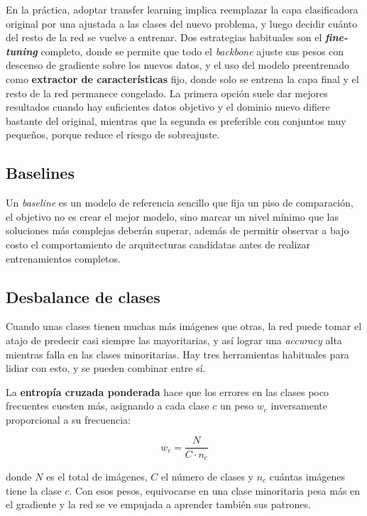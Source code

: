 \documentclass[12pt,letterpaper]{article}
\begin{document}
En la pr\'actica, adoptar transfer learning implica reemplazar la capa clasificadora original por una ajustada a las clases del nuevo problema, y luego decidir cu\'anto del resto de la red se vuelve a entrenar. Dos estrategias habituales son el \textbf{\textit{fine-tuning}} completo, donde se permite que todo el \textit{backbone} ajuste sus pesos con descenso de gradiente sobre los nuevos datos, y el uso del modelo preentrenado como \textbf{extractor de caracter\'isticas} fijo, donde solo se entrena la capa final y el resto de la red permanece congelado. La primera opci\'on suele dar mejores resultados cuando hay suficientes datos objetivo y el dominio nuevo difiere bastante del original, mientras que la segunda es preferible con conjuntos muy peque\~nos, porque reduce el riesgo de sobreajuste.

\subsection{Baselines}

Un \textit{baseline} es un modelo de referencia sencillo que fija un piso de comparaci\'on, el objetivo no es crear el mejor modelo, sino marcar un nivel m\'inimo que las soluciones m\'as complejas deber\'an superar, además de permitir observar a bajo costo el comportamiento de arquitecturas candidatas antes de realizar entrenamientos completos.

\subsection{Desbalance de clases}

Cuando unas clases tienen muchas m\'as im\'agenes que otras, la red puede tomar el atajo de predecir casi siempre las mayoritarias, y as\'i lograr una \textit{accuracy} alta mientras falla en las clases minoritarias. Hay tres herramientas habituales para lidiar con esto, y se pueden combinar entre s\'i.

La \textbf{entrop\'ia cruzada ponderada} hace que los errores en las clases poco frecuentes cuesten m\'as, asignando a cada clase $c$ un peso $w_c$ inversamente proporcional a su frecuencia:

\begin{equation}
w_c = \frac{N}{C \cdot n_c}
\end{equation}

donde $N$ es el total de im\'agenes, $C$ el n\'umero de clases y $n_c$ cu\'antas im\'agenes tiene la clase $c$. Con esos pesos, equivocarse en una clase minoritaria pesa m\'as en el gradiente y la red se ve empujada a aprender tambi\'en sus patrones.
\end{document}
